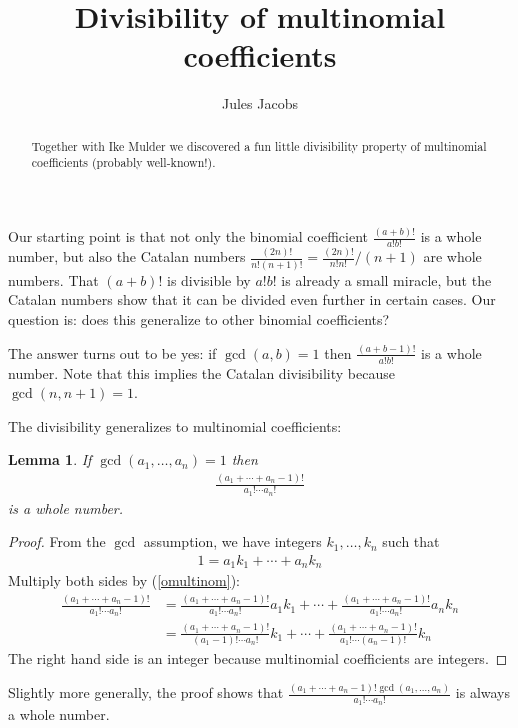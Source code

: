 

\newcommand{\tac}[1]{\lstinline[mathescape]~#1~}
\newcommand{\ciff}{\ \leftrightarrow\ }
\newcommand{\hyp}{\tac{H}}
\newcommand{\hypB}{\tac{G}}
\newcommand{\var}{\tac{x}}
\newcommand{\varB}{\tac{y}}

\newtheorem*{nlemma}{Lemma}


\title{Divisibility of multinomial coefficients}
\author{Jules Jacobs}


\maketitle
\begin{abstract}
  Together with Ike Mulder we discovered a fun little divisibility property of multinomial coefficients (probably well-known!).
\end{abstract}

Our starting point is that not only the binomial coefficient $\frac{(a+b)!}{a! b!}$ is a whole number,
but also the Catalan numbers $\frac{(2n)!}{n! (n+1)!} = \frac{(2n)!}{n!n!} / (n+1)$ are whole numbers.
That $(a+b)!$ is divisible by $a! b!$ is already a small miracle, but the Catalan numbers show that it can be divided even further in certain cases. Our question is: does this generalize to other binomial coefficients?

The answer turns out to be yes: if $\gcd(a, b) = 1$ then $\frac {(a + b - 1)!}{a! b!}$ is a whole number.
Note that this implies the Catalan divisibility because $\gcd(n,n+1) = 1$.

The divisibility generalizes to multinomial coefficients:

\begin{nlemma}
  If $\gcd(a_1, \dots, a_n) = 1$ then
  \begin{align}
    \label{omultinom}
    \frac
      {(a_1 + \cdots + a_n - 1)!}
      {a_1! \cdots a_n!}
  \end{align}
  is a whole number.
\end{nlemma}
\begin{proof}
  From the $\gcd$ assumption, we have integers $k_1,\dots,k_n$ such that
  \begin{align*}
    1 = a_1 k_1 + \cdots + a_n k_n
  \end{align*}
  Multiply both sides by (\ref{omultinom}):
  \begin{align*}
    \frac
      {(a_1 + \cdots + a_n - 1)!}
      {a_1! \cdots a_n!} &=
        \frac
          {(a_1 + \cdots + a_n - 1)!}
          {a_1! \cdots a_n!} a_1 k_1
        + \cdots +
        \frac
          {(a_1 + \cdots + a_n - 1)!}
          {a_1! \cdots a_n!} a_n k_n \\
      &=
      \frac
          {(a_1 + \cdots + a_n - 1)!}
          {(a_1 - 1)! \cdots a_n!} k_1
        + \cdots +
        \frac
          {(a_1 + \cdots + a_n - 1)!}
          {a_1! \cdots (a_n - 1)!} k_n
  \end{align*}
  The right hand side is an integer because multinomial coefficients are integers.
\end{proof}

Slightly more generally, the proof shows that
  $\frac
    {(a_1 + \cdots + a_n - 1)! \gcd(a_1, \dots, a_n)}
    {a_1! \cdots a_n!}$
is always a whole number.
